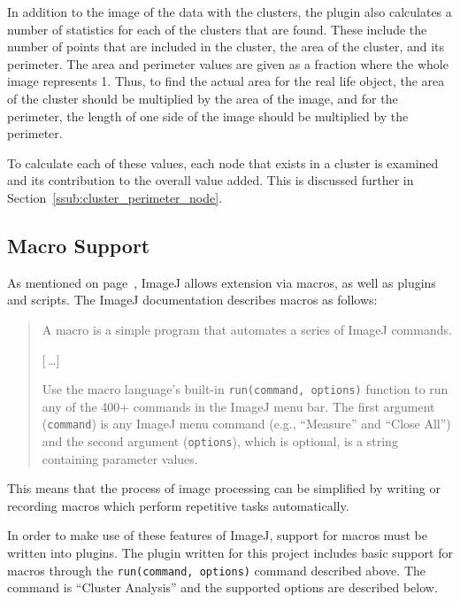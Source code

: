 In addition to the image of the data with the clusters, the plugin also
calculates a number of statistics for each of the clusters that are found.
These include the number of points that are included in the cluster, the area
of the cluster, and its perimeter. The area and perimeter values are given as
a fraction where the whole image represents 1. Thus, to find the actual area
for the real life object, the area of the cluster should be multiplied by the
area of the image, and for the perimeter, the length of one side of the image
should be multiplied by the perimeter.

To calculate each of these values, each node that exists in a cluster is
examined and its contribution to the overall value added. This is discussed
further in Section~\ref{ssub:cluster_perimeter_node}.

\subsection{Macro Support}
\label{sub:macro_support}

As mentioned on page~\pageref{prt:imagej_plugin}, ImageJ allows extension via
macros, as well as plugins and scripts. The ImageJ documentation describes
macros as follows:

\begin{quote}
	A macro is a simple program that automates a series of ImageJ
	commands.

	[\,\ldots]

	Use the macro language's built-in \texttt{run(command,
	options)} function to run any of the 400+ commands in the ImageJ menu
	bar.  The first argument (\texttt{command}) is any ImageJ menu command
	(e.g., ``Measure'' and ``Close All'') and the second argument
	(\texttt{options}), which is optional, is a string containing parameter
	values.\\
	\hspace*{\fill}\cite{imagejapi}
\end{quote}

This means that the process of image processing can be simplified by writing or
recording macros which perform repetitive tasks automatically.

In order to make use of these features of ImageJ, support for macros must be
written into plugins. The plugin written for this project includes basic
support for macros through the \texttt{run(command, options)} command described
above. The command is ``Cluster Analysis'' and the supported options are
described below.

